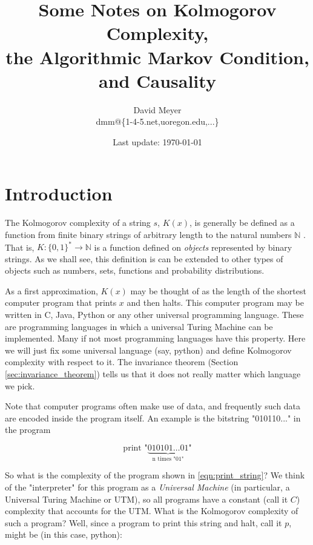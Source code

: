 \documentclass[11pt, oneside]{article}   	%
\title{Some Notes on Kolmogorov Complexity, \\  the Algorithmic Markov Condition, and Causality}
\author{David Meyer \\ dmm@\{1-4-5.net,uoregon.edu,...\}}
\date{Last update: \today}							%
\begin{document}
\maketitle


\section{Introduction} 
\label{sec:intro}
The Kolmogorov complexity of a string $s$, $K(x)$,  is generally be defined as a function from finite binary strings of arbitrary length to the natural numbers 
$\mathbb{N}$ \cite{Janzing:2010:CIU:1870245.1870271}.
That is,  $K: \{0,1\}^* \rightarrow  \mathbb{N}$  is a function defined on \emph{objects} represented by binary strings. As we shall see, this definition is can be extended to 
other types of objects such as numbers, sets, functions and probability distributions.

\bigskip
\noindent
As a first approximation, $K(x)$ may be thought of as the length of the shortest computer program that prints $x$ and then halts. This computer program may be written in C, Java, Python or any other universal programming language. These are programming languages in which a universal Turing Machine can be implemented. Many if not most  programming languages have this property. Here we will just fix some universal language (say, python) and define Kolmogorov complexity with respect to it. The invariance theorem (Section \ref{sec:invariance_theorem}) tells us that it does not really matter which language we pick. 

\bigskip
\noindent
Note that computer programs often make use of data, and frequently such data are encoded inside the program itself. An example is the bitstring "010110..." in the program

\begin{equation}
\label{eqn:print_string}
\text{print }  \text{"}\underbrace{010101\hdots01}_{\text{n times "01"}} \text{"}
\end{equation}

\bigskip
\noindent
So what is the complexity of the program shown in  \ref{eqn:print_string}? We think of the "interpreter" for this program as a \emph{Universal Machine} (in particular, a Universal Turing Machine or UTM), 
so all programs have a constant (call it $C$) complexity that accounts for the UTM. What is the Kolmogorov complexity of such a program? Well, since a program to print this string and halt, 
call it $p$, might be (in this case, python):
\end{document}
